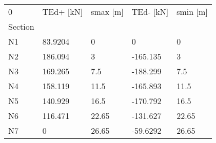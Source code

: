 \begin{tabular}{lllll}
\toprule
0 & TEd+ [kN] & smax [m] & TEd- [kN] & smin [m] \\
Section &           &          &           &          \\
\midrule
N1      &   83.9204 &        0 &         0 &        0 \\
N2      &   186.094 &        3 &  -165.135 &        3 \\
N3      &   169.265 &      7.5 &  -188.299 &      7.5 \\
N4      &   158.119 &     11.5 &  -165.893 &     11.5 \\
N5      &   140.929 &     16.5 &  -170.792 &     16.5 \\
N6      &   116.471 &    22.65 &  -131.627 &    22.65 \\
N7      &         0 &    26.65 &  -59.6292 &    26.65 \\
\bottomrule
\end{tabular}
